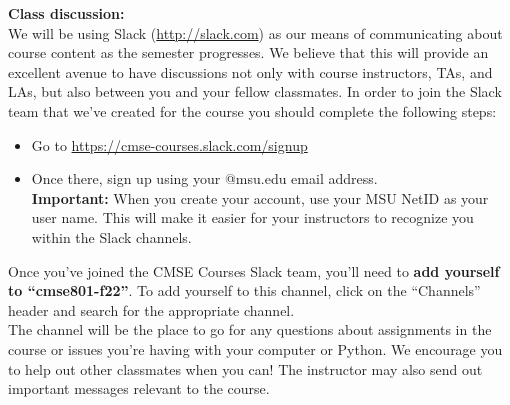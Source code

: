 \documentclass[oneside,letterpaper,11pt]{exam}
\begin{document}
{\noindent \textbf{Class discussion:}}\\[-5pt]

{\noindent We will be using Slack (\url{http://slack.com}) as our means of communicating about course content as the semester progresses. We believe that this will provide an excellent avenue to have discussions not only with course instructors, TAs, and LAs, but also between you and your fellow classmates. In order to join the Slack team that we've created for the course you should complete the following steps:}
\begin{itemize}
\item[1.] Go to \url{https://cmse-courses.slack.com/signup} \\[-15pt]
\item[2.] Once there, sign up using your @msu.edu email address. \\ \textbf{Important:} When you
create your account, use your MSU NetID as your user name. This will make it easier for your instructors to recognize you within the Slack channels.
\end{itemize}
{\noindent Once you've joined the CMSE Courses Slack team, you'll need to \textbf{add yourself to ``cmse801-f22''}. To add yourself to this channel, click on the ``Channels'' header and search for the appropriate channel.}\\[-5pt]

{\noindent The channel will be the place to go for any questions about assignments in the course or issues you're having with your computer or Python. We encourage you to help out other classmates when you can! The instructor may also send out important messages relevant to the course.}\\[-5pt]
\end{document}
